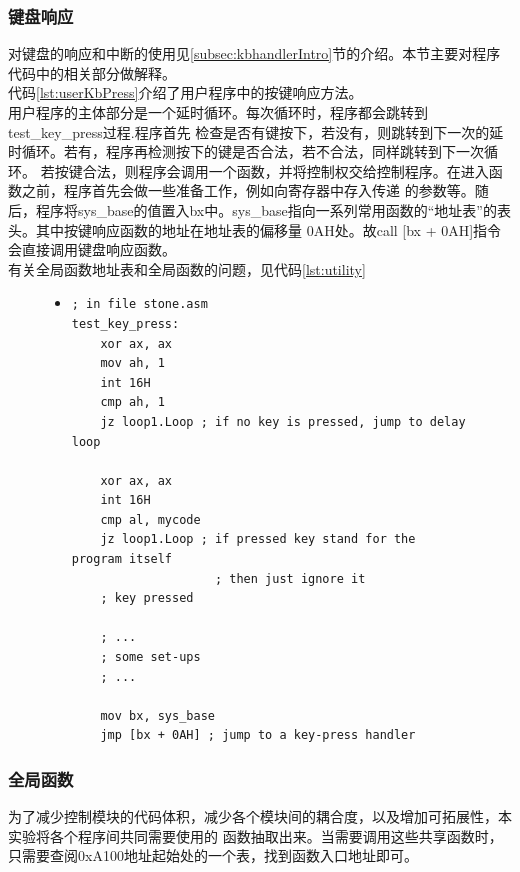 \documentclass[a4paper]{article}
\begin{document}
    \subsubsection{键盘响应} \label{subsec:kbhandler}
    对键盘的响应和中断的使用见\ref{subsec:kbhandlerIntro}节的介绍。本节主要对程序代码中的相关部分做解释。\\

    代码\ref{lst:userKbPress}介绍了用户程序中的按键响应方法。\\
    
    用户程序的主体部分是一个延时循环。每次循环时，程序都会跳转到test\_key\_press过程.程序首先
    检查是否有键按下，若没有，则跳转到下一次的延时循环。若有，程序再检测按下的键是否合法，若不合法，同样跳转到下一次循环。
    若按键合法，则程序会调用一个函数，并将控制权交给控制程序。在进入函数之前，程序首先会做一些准备工作，例如向寄存器中存入传递
    的参数等。随后，程序将sys\_base的值置入bx中。sys\_base指向一系列常用函数的``地址表''的表头。其中按键响应函数的地址在地址表的偏移量
    0AH处。故call [bx + 0AH]指令会直接调用键盘响应函数。 \\
     
    有关全局函数地址表和全局函数的问题，见代码\ref{lst:utility}
    
    \begin{figure}
    \begin{itemize}
    \item[] \begin{lstlisting}[language={[x86masm]Assembler}, label=lst:userKbPress, caption=用户程序中对键盘按下的响应]
; in file stone.asm
test_key_press:
    xor ax, ax
    mov ah, 1
    int 16H
    cmp ah, 1
    jz loop1.Loop ; if no key is pressed, jump to delay loop

    xor ax, ax
    int 16H
    cmp al, mycode
    jz loop1.Loop ; if pressed key stand for the program itself
                    ; then just ignore it
    ; key pressed

    ; ...
    ; some set-ups
    ; ...

    mov bx, sys_base
    jmp [bx + 0AH] ; jump to a key-press handler
    \end{lstlisting}
    \end{itemize}
    \end{figure}

    \subsubsection{全局函数} \label{subsec:globalFunc}
    为了减少控制模块的代码体积，减少各个模块间的耦合度，以及增加可拓展性，本实验将各个程序间共同需要使用的
    函数抽取出来。当需要调用这些共享函数时，只需要查阅0xA100地址起始处的一个表，找到函数入口地址即可。\\ 
\end{document}
